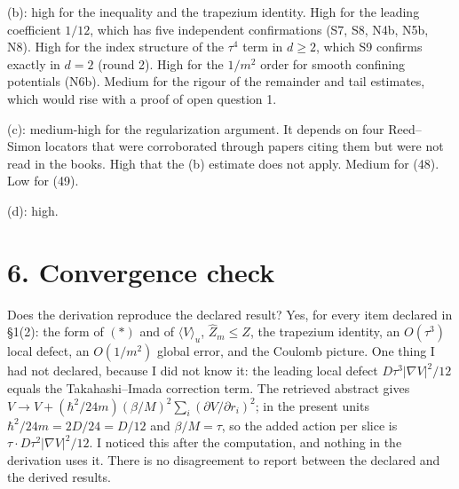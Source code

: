 \documentclass[11pt,a4paper]{article}
\begin{document}
(b): high for the inequality and the trapezium identity. High for the leading coefficient \(1/12\), which has five independent confirmations (S7, S8, N4b, N5b, N8). High for the index structure of the \(\tau^4\) term in \(d\ge2\), which S9 confirms exactly in \(d=2\) (round 2). High for the \(1/m^2\) order for smooth confining potentials (N6b). Medium for the rigour of the remainder and tail estimates, which would rise with a proof of open question 1.

(c): medium-high for the regularization argument. It depends on four Reed--Simon locators that were corroborated through papers citing them but were not read in the books. High that the (b) estimate does not apply. Medium for (48). Low for (49).

(d): high.

\hypertarget{convergence-check}{%
\section{6. Convergence check}\label{convergence-check}}

Does the derivation reproduce the declared result? Yes, for every item declared in §1(2): the form of \((\ast)\) and of \(\langle V\rangle_u\), \(\hat Z_m\le Z\), the trapezium identity, an \(O(\tau^3)\) local defect, an \(O(1/m^2)\) global error, and the Coulomb picture. One thing I had not declared, because I did not know it: the leading local defect \(D\tau^3|\nabla V|^2/12\) equals the Takahashi--Imada correction term. The retrieved abstract gives \(V\to V+(\hbar^2/24m)(\beta/M)^2\sum_i(\partial V/\partial r_i)^2\); in the present units \(\hbar^2/24m=2D/24=D/12\) and \(\beta/M=\tau\), so the added action per slice is \(\tau\cdot D\tau^2|\nabla V|^2/12\). I noticed this after the computation, and nothing in the derivation uses it. There is no disagreement to report between the declared and the derived results.
\end{document}
